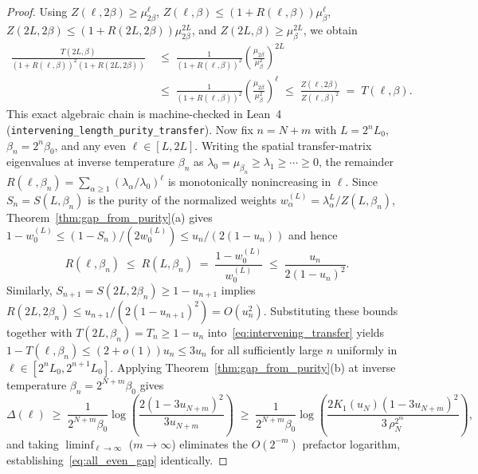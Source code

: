 \documentclass[11pt,a4paper]{article}
\theoremstyle{definition}
\begin{document}
\begin{proof}
Using $Z(\ell,2\beta) \ge \mu_{2\beta}^\ell$, $Z(\ell,\beta) \le (1 + R(\ell,\beta))\mu_\beta^\ell$, $Z(2L,2\beta) \le (1 + R(2L,2\beta))\mu_{2\beta}^{2L}$, and $Z(2L,\beta) \ge \mu_\beta^{2L}$, we obtain
\begin{align*}
  \frac{T(2L,\beta)}{(1 + R(\ell,\beta))^2 (1 + R(2L,2\beta))}
  &\;\le\; \frac{1}{(1 + R(\ell,\beta))^2} \left(\frac{\mu_{2\beta}}{\mu_\beta^2}\right)^{2L} \\
  &\;\le\; \frac{1}{(1 + R(\ell,\beta))^2} \left(\frac{\mu_{2\beta}}{\mu_\beta^2}\right)^\ell
   \;\le\; \frac{Z(\ell,2\beta)}{Z(\ell,\beta)^2}
   \;=\; T(\ell,\beta).
\end{align*}
This exact algebraic chain is machine-checked in Lean~4 (\texttt{intervening\_length\_purity\_transfer}). Now fix $n = N + m$ with $L = 2^n L_0$, $\beta_n = 2^n \beta_0$, and any even $\ell \in [L, 2L]$. Writing the spatial transfer-matrix eigenvalues at inverse temperature $\beta_n$ as $\lambda_0 = \mu_{\beta_n} \ge \lambda_1 \ge \cdots \ge 0$, the remainder $R(\ell, \beta_n) = \sum_{\alpha \ge 1}(\lambda_\alpha/\lambda_0)^\ell$ is monotonically nonincreasing in $\ell$. Since $S_n = S(L, \beta_n)$ is the purity of the normalized weights $w_\alpha^{(L)} = \lambda_\alpha^L / Z(L, \beta_n)$, Theorem~\ref{thm:gap_from_purity}(a) gives $1 - w_0^{(L)} \le (1 - S_n)/(2 w_0^{(L)}) \le u_n / (2(1-u_n))$ and hence
\[
  R(\ell, \beta_n) \;\le\; R(L, \beta_n) \;=\; \frac{1 - w_0^{(L)}}{w_0^{(L)}} \;\le\; \frac{u_n}{2(1 - u_n)^2}.
\]
Similarly, $S_{n+1} = S(2L, 2\beta_n) \ge 1 - u_{n+1}$ implies $R(2L, 2\beta_n) \le u_{n+1} / (2(1 - u_{n+1})^2) = O(u_n^2)$. Substituting these bounds together with $T(2L, \beta_n) = T_n \ge 1 - u_n$ into~\eqref{eq:intervening_transfer} yields $1 - T(\ell, \beta_n) \le (2 + o(1)) u_n \le 3 u_n$ for all sufficiently large $n$ uniformly in $\ell \in [2^n L_0, 2^{n+1} L_0]$. Applying Theorem~\ref{thm:gap_from_purity}(b) at inverse temperature $\beta_n = 2^{N+m}\beta_0$ gives
\[
  \Delta(\ell) \;\ge\; \frac{1}{2^{N+m}\beta_0} \log\!\left(\frac{2(1 - 3 u_{N+m})^2}{3 u_{N+m}}\right)
  \;\ge\; \frac{1}{2^{N+m}\beta_0} \log\!\left(\frac{2 K_1(u_N)(1 - 3 u_{N+m})^2}{3\,\rho_N^{2^m}}\right),
\]
and taking $\liminf_{\ell\to\infty}$ ($m \to \infty$) eliminates the $O(2^{-m})$ prefactor logarithm, establishing~\eqref{eq:all_even_gap} identically.
\end{proof}
\end{document}
